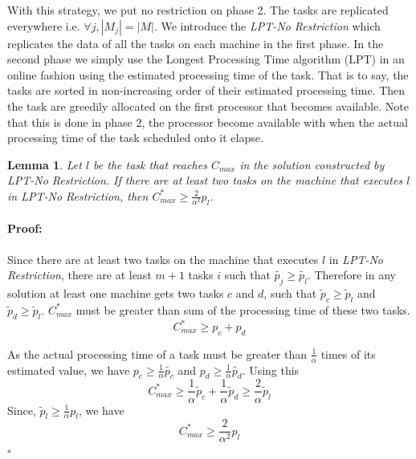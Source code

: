 \documentclass[12pt]{article}
\theoremstyle{mystyle}
\newtheorem{lemma}[theorem]{Lemma}
\newenvironment{myproof}{\paragraph{Proof:}}{\hfill$\square$}
\begin{document}
   With this strategy, we put no restriction on phase 2. The tasks are
   replicated everywhere i.e. $\forall j, |M_{j}|=|M|$. We introduce the
   \textit{LPT-No Restriction} which replicates the data of all the tasks
   on each machine in the first phase. In the second phase we simply use
   the Longest Processing Time algorithm (LPT) in an online fashion using
   the estimated processing time of the task. That is to say, the tasks
   are sorted in non-increasing order of their estimated processing
   time. Then the task are greedily allocated on the first
   processor that becomes available. Note that this is done in phase 2,
   the processor become available with when the actual processing time of
   the task scheduled onto it elapse.
   
   \begin{lemma}\label{No Restriction}
     Let $l$ be the task that reaches $C_{max}$ in the solution
     constructed by \textit{LPT-No Restriction}. If there are at least two
     tasks on the machine that executes $l$ in \textit{LPT-No Restriction}, then 
     $C_{max}^* \geq {\frac{2}{\alpha^{2}}} p_l$.
   \end{lemma}
   \begin{myproof}
     Since there are at least two tasks on the machine that executes $l$
     in \textit{LPT-No Restriction}, there are at least $m+1$ tasks $i$
     such that $\tilde{p_j} \geq \tilde{p_l}$. Therefore in any solution
     at least one machine gets two tasks $c$ and $d$, such that $\tilde
     p_c \geq \tilde p_l$ and $\tilde p_d \geq \tilde p_l$. $C_{max}^{*}$
     must be greater than sum of the processing time of these two tasks.
      \begin{equation}\nonumber
       C_{max}^{*}\geq p_c + p_d
     \end{equation}	
   
     As the actual processing time of a task must be greater than  $\frac{1}{\alpha}$ times of its estimated value, we have $p_c \geq \frac{1}{\alpha}\tilde{p_c}$ and $p_d \geq \frac{1}{\alpha}\tilde{p_d}$. Using this
     \begin{equation}\nonumber 
       C_{max}^{*} \geq \frac{1}{\alpha}\tilde p_c +  \frac{1}{\alpha} \tilde p_d \geq \frac{2}{\alpha}\tilde p_l
     \end{equation}
   Since, $\tilde p_l \geq \frac{1}{\alpha} p_l$, we have
     \begin{equation}\nonumber
       C_{max}^{*} \geq {\frac{2}{\alpha^{2}}} p_l 
     \end{equation}
   \end{myproof}
   
\end{document}
